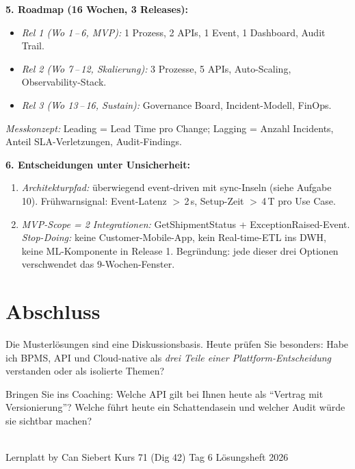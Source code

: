\documentclass[11pt,a4paper,oneside]{article}
\begin{document}
\begin{loesungbox}
\smallskip
\textbf{5. Roadmap (16 Wochen, 3 Releases):}
\begin{itemize}
  \item \emph{Rel 1 (Wo 1\,--\,6, MVP):} 1 Prozess, 2 APIs, 1 Event, 1 Dashboard, Audit Trail.
  \item \emph{Rel 2 (Wo 7\,--\,12, Skalierung):} 3 Prozesse, 5 APIs, Auto-Scaling, Observability-Stack.
  \item \emph{Rel 3 (Wo 13\,--\,16, Sustain):} Governance Board, Incident-Modell, FinOps.
\end{itemize}
\emph{Messkonzept:} Leading = Lead Time pro Change; Lagging = Anzahl Incidents, Anteil SLA-Verletzungen, Audit-Findings.

\smallskip
\textbf{6. Entscheidungen unter Unsicherheit:}
\begin{enumerate}
  \item \emph{Architekturpfad:} \"uberwiegend event-driven mit sync-Inseln (siehe Aufgabe 10). Fr\"uhwarnsignal: Event-Latenz $>$\,2\,s, Setup-Zeit $>$\,4\,T pro Use Case.
  \item \emph{MVP-Scope = 2 Integrationen:} GetShipmentStatus + ExceptionRaised-Event. \emph{Stop-Doing:} keine Customer-Mobile-App, kein Real-time-ETL ins DWH, keine ML-Komponente in Release 1. Begr\"undung: jede dieser drei Optionen verschwendet das 9-Wochen-Fenster.
\end{enumerate}
\end{loesungbox}

\clearpage

\section*{Abschluss}
\thispagestyle{plain}

\noindent Die Musterl\"osungen sind eine Diskussionsbasis. Heute pr\"ufen Sie besonders: Habe ich BPMS, API und Cloud-native als \emph{drei Teile einer Plattform-Entscheidung} verstanden \textendash{} oder als isolierte Themen?

\medskip
\begin{infobox}
Bringen Sie ins Coaching: Welche API gilt bei Ihnen heute als ``Vertrag mit Versionierung''? Welche f\"uhrt heute ein Schattendasein \textendash{} und welcher Audit w\"urde sie sichtbar machen?
\end{infobox}

\vspace{1cm}
\noindent{\color{lpAccent}\rule{\linewidth}{0.6pt}}\\[4pt]
{\footnotesize\sffamily\color{lpGray}Lernplatt \textperiodcentered{} by Can Siebert \textperiodcentered{} Kurs 71 (Dig 42) \textperiodcentered{} Tag 6 \textperiodcentered{} L\"osungsheft \textperiodcentered{} \textcopyright{} 2026}
\end{document}
